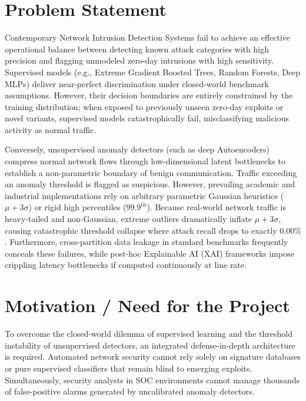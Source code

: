 \documentclass[12pt,a4paper]{report}
\begin{document}
\section{Problem Statement}
Contemporary Network Intrusion Detection Systems fail to achieve an effective operational balance between detecting known attack categories with high precision and flagging unmodeled zero-day intrusions with high sensitivity. Supervised models (e.g., Extreme Gradient Boosted Trees, Random Forests, Deep MLPs) deliver near-perfect discrimination under closed-world benchmark assumptions. However, their decision boundaries are entirely constrained by the training distribution; when exposed to previously unseen zero-day exploits or novel variants, supervised models catastrophically fail, misclassifying malicious activity as normal traffic.

Conversely, unsupervised anomaly detectors (such as deep Autoencoders) compress normal network flows through low-dimensional latent bottlenecks to establish a non-parametric boundary of benign communication. Traffic exceeding an anomaly threshold is flagged as suspicious. However, prevailing academic and industrial implementations rely on arbitrary parametric Gaussian heuristics ($\mu + 3\sigma$) or rigid high percentiles ($99.9^{\text{th}}$). Because real-world network traffic is heavy-tailed and non-Gaussian, extreme outliers dramatically inflate $\mu + 3\sigma$, causing catastrophic threshold collapse where attack recall drops to exactly $0.00\%$. Furthermore, cross-partition data leakage in standard benchmarks frequently conceals these failures, while post-hoc Explainable AI (XAI) frameworks impose crippling latency bottlenecks if computed continuously at line rate.

\section{Motivation / Need for the Project}
To overcome the closed-world dilemma of supervised learning and the threshold instability of unsupervised detectors, an integrated defense-in-depth architecture is required. Automated network security cannot rely solely on signature databases or pure supervised classifiers that remain blind to emerging exploits. Simultaneously, security analysts in SOC environments cannot manage thousands of false-positive alarms generated by uncalibrated anomaly detectors.
\end{document}
